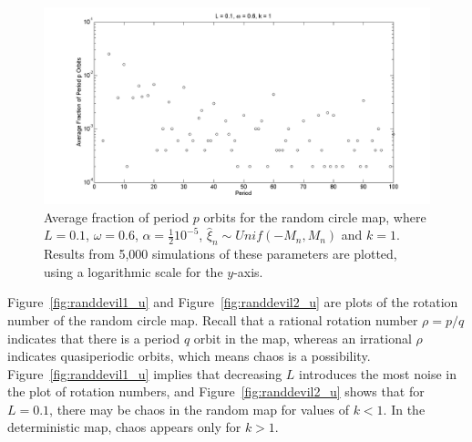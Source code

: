 \begin{figure}[H]\linespread{1}
\caption[Log-scale plot of average fraction of period $p$ orbits for the random circle
map (uniform distribution), for $\alpha=\frac{1}{2}10^{-5}$, $\omega=0.6$ and $k=1$]{Average fraction of period $p$ orbits for the random circle map,
  where $L=0.1$, $\omega =0.6$, $\alpha = \frac{1}{2}10^{-5}$, $\hat{\xi}_n\sim
  Unif(-M_n,M_n)$ and $k=1$. Results from 5,000 simulations of these
  parameters are plotted, using a logarithmic scale for the
  $y$-axis.}\label{fig:avgcircorbs_ha}
	\begin{center}		\includegraphics[width=.8\textwidth]{figs/rcirc_u_avg_num_logscale_ha.png}
	\end{center}
\end{figure}


Figure~\ref{fig:randdevil1_u} and Figure~\ref{fig:randdevil2_u} are
plots of the rotation number of the random circle map. Recall that a
rational rotation number $\rho = p/q$ indicates that there is a period
$q$ orbit in the map, whereas an irrational $\rho$ indicates
quasiperiodic orbits, which means chaos is a
possibility. Figure~\ref{fig:randdevil1_u} implies that decreasing $L$
introduces the most noise in the plot of rotation numbers, and
Figure~\ref{fig:randdevil2_u} shows that for $L=0.1$, there may be
chaos in the random map for values of $k<1$. In the deterministic map,
chaos appears only for $k>1$.

